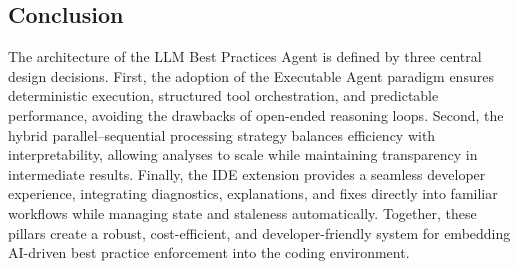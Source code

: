 \begin{spacing}{1.2}
\subsection*{Conclusion}
The architecture of the LLM Best Practices Agent is defined by three central design decisions. First, the adoption of the Executable Agent paradigm ensures deterministic execution, structured tool orchestration, and predictable performance, avoiding the drawbacks of open-ended reasoning loops. Second, the hybrid parallel–sequential processing strategy balances efficiency with interpretability, allowing analyses to scale while maintaining transparency in intermediate results. Finally, the IDE extension provides a seamless developer experience, integrating diagnostics, explanations, and fixes directly into familiar workflows while managing state and staleness automatically. Together, these pillars create a robust, cost-efficient, and developer-friendly system for embedding AI-driven best practice enforcement into the coding environment.
\end{spacing}
